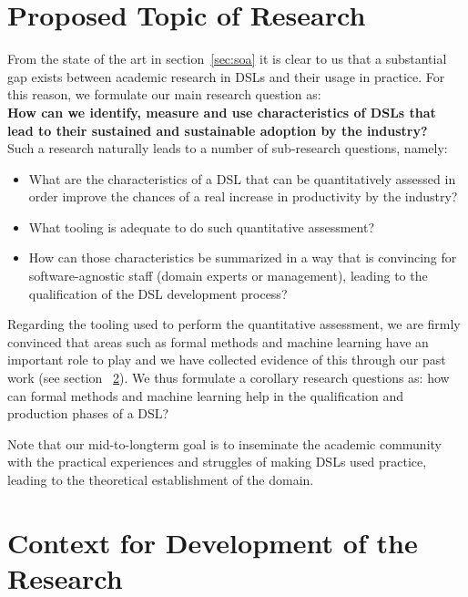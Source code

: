 \documentclass{scrartcl}
\begin{document}
\section{Proposed Topic of Research}
\label{sec:topic}

From the state of the art in section~\ref{sec:soa} it is clear to us that a
substantial gap exists between academic research in DSLs and their usage in
practice. For this reason, we formulate our main research question as:\\

\textbf{How can we identify, measure and use characteristics of DSLs that lead
to their sustained and sustainable adoption by the industry?}\\

Such a research naturally leads to a number of sub-research questions, namely:

\begin{itemize}
  \item What are the characteristics of a DSL that can be quantitatively
  assessed in order improve the chances of a real increase in productivity by
  the industry?
  \item What tooling is adequate to do such quantitative assessment?
  \item How can those characteristics be summarized in a way that is convincing
  for software-agnostic staff (domain experts or management), leading to the
  qualification of the DSL development process?
\end{itemize}

Regarding the tooling used to perform the quantitative assessment, we are firmly
convinced that areas such as formal methods and machine learning have an
important role to play and we have collected evidence of this through our past
work (see section ~\ref{sec:context4dev}). We thus formulate a corollary
research questions as: how can formal methods and machine learning help
in the qualification and production phases of a DSL?

Note that our mid-to-longterm goal is to inseminate the academic community with
the practical experiences and struggles of making DSLs used practice, leading
to the theoretical establishment of the domain.

\section{Context for Development of the Research}
\label{sec:context4dev}
\end{document}
